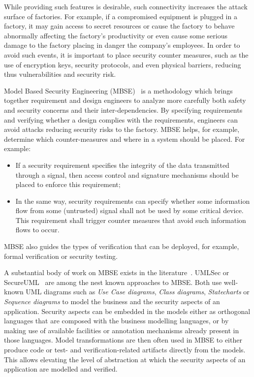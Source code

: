 While providing such features is desirable, such connectivity increases the attack surface of factories. For example, if a compromised equipment is plugged in a factory, it may gain access to secret resources or cause the factory to behave abnormally affecting the factory's productivity or even cause some serious damage to the factory placing in danger the company's employees. In order to avoid such events, it is important to place security counter measures, such as the use of encryption keys, security protocols, and even physical barriers, reducing thus vulnerabilities and security risk. 

Model Based Security Engineering (MBSE)~\cite{umlsec,secureuml} is a methodology
which brings together requirement and design engineers to analyze more carefully both safety and security concerns and their inter-dependencies. By specifying requirements and verifying whether a design complies with the requirements, engineers can avoid attacks reducing security risks to the factory. MBSE helps, for example, determine which counter-measures and where in a system should be placed. For example:
\begin{itemize}
  \item If a security requirement specifies the integrity of the data transmitted through a signal, then  access control and signature mechanisms should be placed to enforce this requirement;

  \item In the same way, security requirements can specify whether some information flow from some (untrusted) signal shall not be used by some critical device. This requirement shall trigger counter measures that avoid such information flows to occur.
\end{itemize}
MBSE also guides the types of verification that can be deployed, for example, formal verification or security testing.

A substantial body of work on MBSE exists in the literature~\cite{advancesmds}.
UMLSec or SecureUML~\cite{umlsec,secureuml} are among the nest known approaches
to MBSE. Both use well-known UML diagrams such as \emph{Use Case diagrams},
\emph{Class diagrams}, \emph{Statecharts} or \emph{Sequence diagrams} to model
the business and the security aspects of an application. Security aspects can be embedded in the models either as orthogonal
languages that are composed with the business modelling languages, or by making
use of available facilities or annotation mechanisms already present in those
languages. Model transformations are then often used in MBSE to either produce
code or test- and verification-related artifacts directly from the models. This
allows elevating the level of abstraction at which the security aspects of an
application are modelled and verified.

